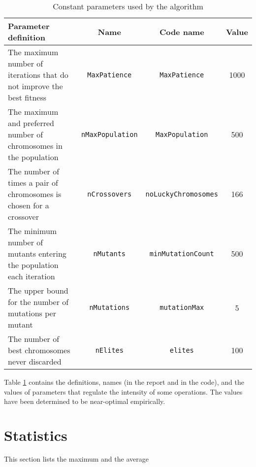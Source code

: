 \documentclass[10pt]{article}
\begin{document}
\begin{table}[!h]
    \begin{center}
        \begin{tabularx}{0.9\textwidth}{|>{\centering\arraybackslash}X|c|c|c|}
        \hline
        \textbf{Parameter definition} & \textbf{Name} & \textbf{Code name} & \textbf{Value} \\\hline
        The maximum number of iterations that do not improve the best fitness & \texttt{MaxPatience} & \texttt{MaxPatience} & 1000 \\\hline
        The maximum and preferred number of chromosomes in the population & \texttt{nMaxPopulation} & \texttt{MaxPopulation} & 500 \\\hline
        The number of times a pair of chromosomes is chosen for a crossover & \texttt{nCrossovers} & \texttt{noLuckyChromosomes} & 166 \\\hline
        The minimum number of mutants entering the population each iteration & \texttt{nMutants} & \texttt{minMutationCount} & 500 \\\hline
        The upper bound for the number of mutations per mutant & \texttt{nMutations} & \texttt{mutationMax} & 5 \\\hline
        The number of best chromosomes never discarded & \texttt{nElites} & \texttt{elites} & 100 \\\hline
    \end{tabularx}
    \end{center}
    \caption{Constant parameters used by the algorithm}\label{paramtable}
\end{table}

Table \ref{paramtable} contains the definitions, names (in the report and in the code),
and the values of parameters that regulate the intensity of some operations. The
values have been determined to be near-optimal empirically.

\section{Statistics}
This section lists the maximum and the average 
\end{document}
